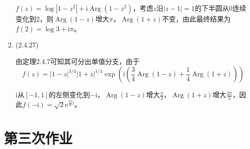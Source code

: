 \documentclass[a4paper,UTF8,fontset=windows]{ctexart}
\DeclareMathOperator{\Arg}{Arg}
\begin{document}
\begin{enumerate}
    $f(z)=\log|1-z^2|+\mathrm{i}\Arg(1-z^2)$，考虑$z$沿$|z-1|=1$的下半圆从0连续变化到2，则$\Arg(1-z)$增大$\pi$，$\Arg(1+z)$不变，由此最终结果为$f(2)=\log3+\mathrm{i}\pi$。
    
    \item (2.4.27)
    
    由定理2.4.7可知其可分出单值分支，由于
    \[f(z)=|1-z|^{3/4}|1+z|^{1/4}\exp\left(\mathrm{i}(\frac{3}{4}\Arg(1-z)+\frac{1}{4}\Arg(1+z))\right)\]
    
    $\mathrm{i}$从$[-1,1]$的左侧变化到$\mathrm{-i}$，$\Arg(1-z)$增大$\frac{\pi}{2}$，$\Arg(1+z)$增大$\frac{3\pi}{2}$，因此$f(-\mathrm{i})=\sqrt2\mathrm{e}^{\frac{5\pi}{8}\mathrm{i}}$。
\end{enumerate}

\section{第三次作业}
\end{document}
